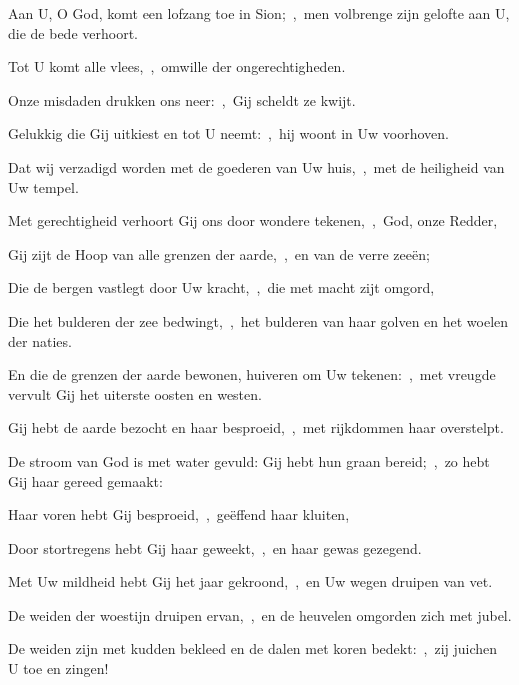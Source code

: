 \documentclass[12pt,twoside,a5paper]{article}
\begin{document}



\begin{halfparskip}
  Aan U, O God, komt een lofzang toe in Sion;~\sep\ men volbrenge zijn gelofte aan U, die de bede verhoort.


  Tot U komt alle vlees,~\sep\ omwille der ongerechtigheden.

  Onze misdaden drukken ons neer:~\sep\ Gij scheldt ze kwijt.

  Gelukkig die Gij uitkiest en tot U neemt:~\sep\ hij woont in Uw voorhoven.

  Dat wij verzadigd worden met de goederen van Uw huis,~\sep\ met de heiligheid van Uw tempel.
\end{halfparskip}


\begin{halfparskip}
  Met gerechtigheid verhoort Gij ons door wondere tekenen,~\sep\ God, onze Redder,

  Gij zijt de Hoop van alle grenzen der aarde,~\sep\ en van de verre zeeën;

  Die de bergen vastlegt door Uw kracht,~\sep\ die met macht zijt omgord,

  Die het bulderen der zee bedwingt,~\sep\ het bulderen van haar golven en het woelen der naties.

  En die de grenzen der aarde bewonen, huiveren om Uw tekenen:~\sep\ met vreugde vervult Gij het uiterste oosten en westen.
\end{halfparskip}


\begin{halfparskip}
  Gij hebt de aarde bezocht en haar besproeid,~\sep\ met rijkdommen haar overstelpt.

  De stroom van God is met water gevuld: Gij hebt hun graan bereid;~\sep\ zo hebt Gij haar gereed gemaakt:

  Haar voren hebt Gij besproeid,~\sep\ geëffend haar kluiten,

  Door stortregens hebt Gij haar geweekt,~\sep\ en haar gewas gezegend.

  Met Uw mildheid hebt Gij het jaar gekroond,~\sep\ en Uw wegen druipen van vet.

  De weiden der woestijn druipen ervan,~\sep\ en de heuvelen omgorden zich met jubel.

  De weiden zijn met kudden bekleed en de dalen met koren bedekt:~\sep\ zij juichen U toe en zingen!
\end{halfparskip}
\end{document}
